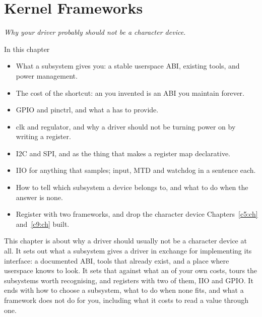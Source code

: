 
\chapter{Kernel Frameworks}
\label{c11:ch}

{\large\itshape Why your driver probably should not be a character device.\par}

\begin{chapterbox}{In this chapter}
\begin{itemize}
  \item What a subsystem gives you: a stable userspace ABI, existing tools, and power management.
  \item The cost of the shortcut: an  you invented is an ABI you maintain forever.
  \item GPIO and pinctrl, and what a  has to provide.
  \item clk and regulator, and why a driver should not be turning power on by writing a register.
  \item I2C and SPI, and  as the thing that makes a register map declarative.
  \item IIO for anything that samples; input, MTD and watchdog in a sentence each.
  \item How to tell which subsystem a device belongs to, and what to do when the answer is none.
  \item Register with two frameworks, and drop the character device Chapters~\ref{c5:ch}
    and~\ref{c9:ch} built.
\end{itemize}
\end{chapterbox}

This chapter is about why a driver should usually not be a character device at all. It sets out
what a subsystem gives a driver in exchange for implementing its interface: a documented ABI, tools
that already exist, and a place where userspace knows to look. It sets that against what an
 of your own costs, tours the subsystems worth recognising, and registers 
with two of them, IIO and GPIO. It ends with how to choose a subsystem, what to do when none fits,
and what a framework does not do for you, including what it costs to read a value through one.

